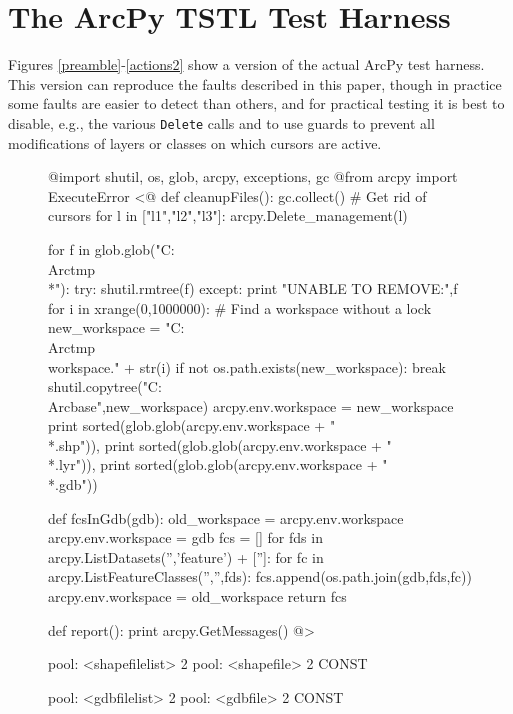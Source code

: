 \section{The ArcPy TSTL Test Harness}

Figures \ref{preamble}-\ref{actions2} show a
version of the actual ArcPy test harness.  This version can reproduce the faults
described in this paper, though in practice some faults are easier to
detect than others, and for practical testing it is best to disable,
e.g., the various {\tt Delete} calls and to use guards to prevent all modifications of
layers or classes on which cursors are active.

\begin{figure}
{\scriptsize
\begin{code}
@import shutil, os, glob, arcpy, exceptions, gc
@from arcpy import ExecuteError
<@
def cleanupFiles():
    gc.collect() \# Get rid of cursors
    for l in ["l1","l2","l3"]:
    	arcpy.Delete\_management(l)
    
    for f in glob.glob("C:\\Arctmp\\*"):
        try:
            shutil.rmtree(f)
        except:
            print "UNABLE TO REMOVE:",f
    for i in xrange(0,1000000): \# Find a workspace without a lock
        new\_workspace = "C:\\Arctmp\\workspace." + str(i)
        if not os.path.exists(new\_workspace):
            break             
    shutil.copytree("C:\\Arcbase",new\_workspace)
    arcpy.env.workspace = new\_workspace
    print sorted(glob.glob(arcpy.env.workspace + "\\*.shp")),
    print sorted(glob.glob(arcpy.env.workspace + "\\*.lyr")),
    print sorted(glob.glob(arcpy.env.workspace + "\\*.gdb"))


def fcsInGdb(gdb):
    old\_workspace = arcpy.env.workspace
    arcpy.env.workspace = gdb
    fcs = []
    for fds in arcpy.ListDatasets('','feature') + ['']:
        for fc in arcpy.ListFeatureClasses('','',fds):
            fcs.append(os.path.join(gdb,fds,fc))
    arcpy.env.workspace = old\_workspace
    return fcs

def report():
    print arcpy.GetMessages()
@>

pool: <shapefilelist> 2
pool: <shapefile> 2 CONST

pool: <gdbfilelist> 2
pool: <gdbfile> 2 CONST


\end{code}}
\end{figure}
